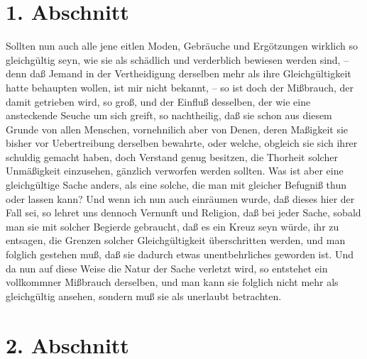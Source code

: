 \section{1. Abschnitt} \label{kap18_ab1}

Sollten nun auch alle jene eitlen Moden, Gebräuche und Ergötzungen wirklich so
gleichgültig seyn, wie sie als schädlich und verderblich bewiesen werden sind,
-- denn daß Jemand in der Vertheidigung derselben mehr als ihre Gleichgültigkeit
hatte behaupten wollen, ist mir nicht bekannt, -- so ist doch der Mißbrauch, der
damit getrieben wird, so groß, und der Einfluß desselben, der wie eine
ansteckende Seuche um sich greift, so nachtheilig, daß sie schon aus diesem
Grunde von allen Menschen, vornehnilich aber von Denen, deren Maßigkeit sie
bisher vor Uebertreibung derselben bewahrte, oder welche, obgleich sie sich
ihrer schuldig gemacht haben, doch Verstand genug besitzen, die Thorheit solcher
Unmäßigkeit einzusehen, gänzlich verworfen werden sollten. Was ist aber eine
gleichgültige Sache anders, als eine solche, die man mit gleicher Befugniß thun
oder lassen kann? Und wenn ich nun auch einräumen wurde, daß dieses hier der
Fall sei, so lehret uns dennoch Vernunft und Religion, daß bei jeder Sache,
sobald man sie mit solcher Begierde gebraucht, daß es ein Kreuz seyn würde, ihr
zu entsagen, die Grenzen solcher Gleichgültigkeit überschritten werden, und man
folglich gestehen muß, daß sie dadurch etwas unentbehrliches geworden ist. Und
da nun auf diese Weise die Natur der Sache verletzt wird, so entstehet ein
vollkommner Mißbrauch derselben, und man kann sie folglich nicht mehr als
gleichgültig ansehen, sondern muß sie als unerlaubt betrachten.

\section{2. Abschnitt} \label{kap18_ab2}

